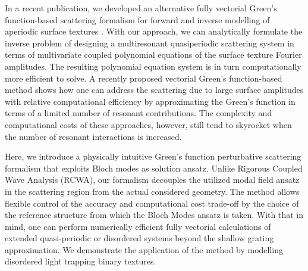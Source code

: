 \documentclass[ floatfix,reprint,amsmath,amssymb,aps,prb]{revtex4-1}
\begin{document}
In a recent publication, we developed an alternative fully vectorial Green's function-based scattering formalism for forward and inverse modelling of aperiodic surface textures \cite{Abass2017}. With our approach, we can analytically formulate the inverse problem of designing a multiresonant quasiperiodic scattering system in terms of multivariate coupled polynomial equations of the surface texture Fourier amplitudes. The resulting polynomial equation system is in turn computationally more efficient to solve.  A recently proposed vectorial Green's function-based method shows how one can address the scattering due to large surface amplitudes with relative computational efficiency by approximating the Green's function in terms of a limited number of resonant contributions\cite{Fehrembach2018}. The complexity and computational costs of these approaches, however, still tend to skyrocket when the number of resonant interactions is increased. 

Here, we introduce a physically intuitive Green's function perturbative scattering formalism that exploits Bloch modes as solution ansatz. Unlike Rigorous Coupled Wave Analysis (RCWA)\cite{Li:96,Li:97}, our formalism decouples the utilized modal field ansatz in the scattering region from the actual considered geometry.  The method allows flexible control of the accuracy and computational cost trade-off by the choice of the reference structure from which the Bloch Modes ansatz is taken. With that in mind, one can perform numerically efficient fully vectorial calculations of extended quasi-periodic or disordered systems beyond the shallow grating approximation. We demonstrate the application of the method by modelling disordered light trapping binary textures. 
\end{document}
